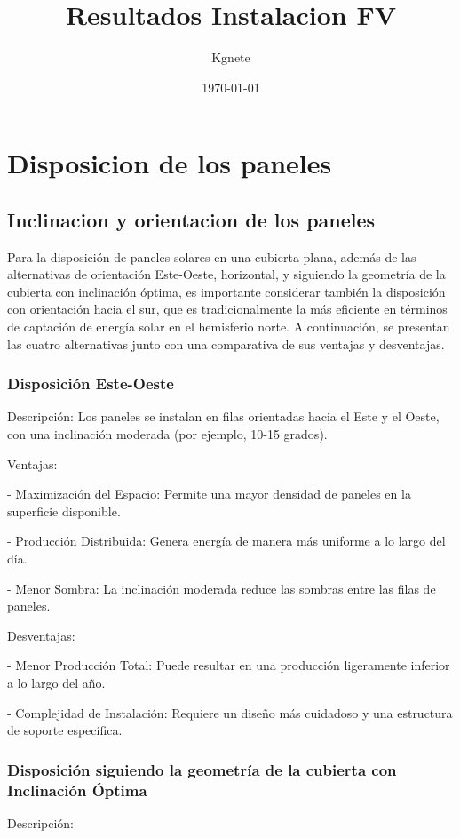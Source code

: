 \documentclass{article}
\title{Resultados Instalacion FV}
\author{Kgnete}
\date{\today}
\begin{document}
\maketitle
\section*{Disposicion de los paneles}


\subsection*{ Inclinacion  y orientacion de los paneles}



Para la disposición de paneles solares en una cubierta plana, además de las alternativas de orientación Este-Oeste, horizontal, y siguiendo la geometría de la cubierta con inclinación óptima, es importante considerar también la disposición con orientación hacia el sur, que es tradicionalmente la más eficiente en términos de captación de energía solar en el hemisferio norte. A continuación, se presentan las cuatro alternativas junto con una comparativa de sus ventajas y desventajas.

\subsubsection*{Disposición Este-Oeste}
Descripción:
Los paneles se instalan en filas orientadas hacia el Este y el Oeste, con una inclinación moderada (por ejemplo, 10-15 grados).

Ventajas:

    - Maximización del Espacio: Permite una mayor densidad de paneles en la superficie disponible.

    - Producción Distribuida: Genera energía de manera más uniforme a lo largo del día.

    - Menor Sombra: La inclinación moderada reduce las sombras entre las filas de paneles.

Desventajas:

    - Menor Producción Total: Puede resultar en una producción ligeramente inferior a lo largo del año.

    - Complejidad de Instalación: Requiere un diseño más cuidadoso y una estructura de soporte específica.


\subsubsection*{Disposición siguiendo la geometría de la cubierta con Inclinación Óptima}
Descripción:
\end{document}
